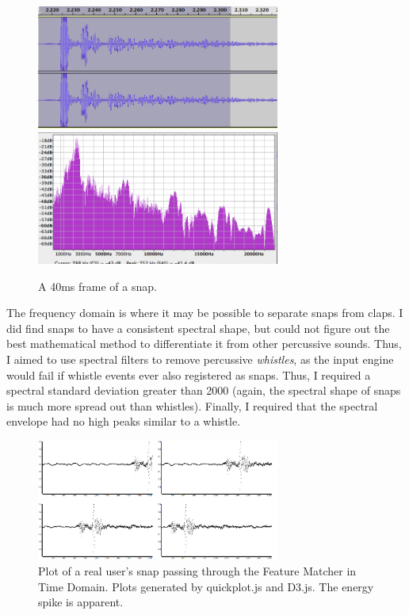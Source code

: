 \documentclass[DIV=calc, paper=a4, fontsize=11pt, twocolumn]{scrartcl}   %
\begin{document}
     \begin{figure}[h]
   \centering
   \includegraphics[width=80mm]{figures/snapTimeDomainFrame.png}
   \includegraphics[width=80mm]{figures/SnapFreqDomainFrame.png}
   \caption{A 40ms frame of a snap. }
   \label{overflow}
   \end{figure}

   \par
   The frequency domain is where it may be possible to separate snaps from claps. I did find snaps to have a consistent spectral shape, but could not figure out the best mathematical method to differentiate it from other percussive sounds. Thus, I aimed to use spectral filters to remove percussive \textit{whistles}, as the input engine would fail if whistle events ever also registered as snaps. Thus, I required a spectral standard deviation greater than 2000 (again, the spectral shape of snaps is much more spread out than whistles). Finally, I required that the spectral envelope had no high peaks similar to a whistle.


   \begin{figure}[h]
   \centering
   \includegraphics[width=80mm]{figures/projectplot}

   \caption{Plot of a real user's snap passing through the Feature Matcher in Time Domain. Plots generated by quickplot.js and D3.js. The energy spike is apparent. }
   \label{overflow}
   \end{figure}
\end{document}
